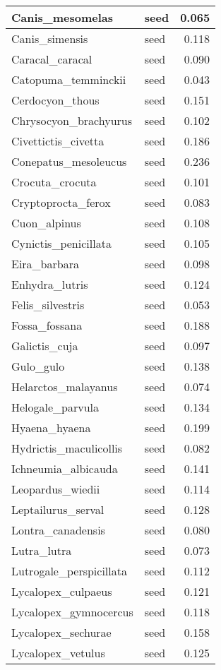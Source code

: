 \begin{table}
\begin{tabular}[t]{l|l|r}
\hline
Canis\_mesomelas & seed & 0.065\\
\hline
Canis\_simensis & seed & 0.118\\
\hline
Caracal\_caracal & seed & 0.090\\
\hline
Catopuma\_temminckii & seed & 0.043\\
\hline
Cerdocyon\_thous & seed & 0.151\\
\hline
Chrysocyon\_brachyurus & seed & 0.102\\
\hline
Civettictis\_civetta & seed & 0.186\\
\hline
Conepatus\_mesoleucus & seed & 0.236\\
\hline
Crocuta\_crocuta & seed & 0.101\\
\hline
Cryptoprocta\_ferox & seed & 0.083\\
\hline
Cuon\_alpinus & seed & 0.108\\
\hline
Cynictis\_penicillata & seed & 0.105\\
\hline
Eira\_barbara & seed & 0.098\\
\hline
Enhydra\_lutris & seed & 0.124\\
\hline
Felis\_silvestris & seed & 0.053\\
\hline
Fossa\_fossana & seed & 0.188\\
\hline
Galictis\_cuja & seed & 0.097\\
\hline
Gulo\_gulo & seed & 0.138\\
\hline
Helarctos\_malayanus & seed & 0.074\\
\hline
Helogale\_parvula & seed & 0.134\\
\hline
Hyaena\_hyaena & seed & 0.199\\
\hline
Hydrictis\_maculicollis & seed & 0.082\\
\hline
Ichneumia\_albicauda & seed & 0.141\\
\hline
Leopardus\_wiedii & seed & 0.114\\
\hline
Leptailurus\_serval & seed & 0.128\\
\hline
Lontra\_canadensis & seed & 0.080\\
\hline
Lutra\_lutra & seed & 0.073\\
\hline
Lutrogale\_perspicillata & seed & 0.112\\
\hline
Lycalopex\_culpaeus & seed & 0.121\\
\hline
Lycalopex\_gymnocercus & seed & 0.118\\
\hline
Lycalopex\_sechurae & seed & 0.158\\
\hline
Lycalopex\_vetulus & seed & 0.125\\

\end{tabular}
\end{table}

